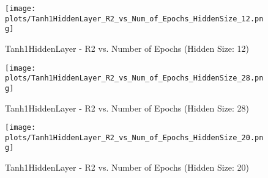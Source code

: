 
\begin{figure}[H]
    \centering
    \texttt{[image: plots/Tanh1HiddenLayer\_R2\_vs\_Num\_of\_Epochs\_HiddenSize\_12.png]}
    \caption{Tanh1HiddenLayer - R2 vs. Number of Epochs (Hidden Size: 12)}
\end{figure}

\begin{figure}[H]
    \centering
    \texttt{[image: plots/Tanh1HiddenLayer\_R2\_vs\_Num\_of\_Epochs\_HiddenSize\_28.png]}
    \caption{Tanh1HiddenLayer - R2 vs. Number of Epochs (Hidden Size: 28)}
\end{figure}

\begin{figure}[H]
    \centering
    \texttt{[image: plots/Tanh1HiddenLayer\_R2\_vs\_Num\_of\_Epochs\_HiddenSize\_20.png]}
    \caption{Tanh1HiddenLayer - R2 vs. Number of Epochs (Hidden Size: 20)}
\end{figure}

